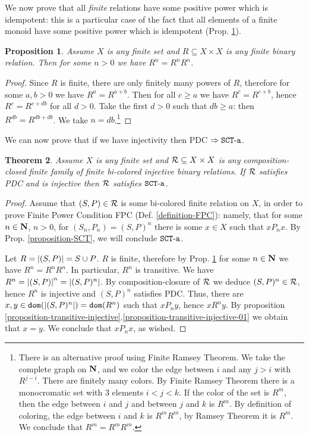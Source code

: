 \documentclass{lmcs}
\newtheorem{theorem}{Theorem}[section]
\newtheorem{proposition}[theorem]{Proposition}
\begin{document}
We now prove that all \emph{finite} relations have some positive power which is idempotent:
this is a particular case of the fact that all elements of a finite monoid 
have some positive power which is idempotent (Prop. \ref{proposition-idempotent-power}).

\begin{proposition}
\label{proposition-idempotent-power}
Assume $X$ is any finite set and $R \subseteq X \times X$ is any finite binary relation.
Then for some $n>0$ we have $R^n=R^nR^n$.
\end{proposition}

\begin{proof}
Since $R$ is finite, there are only finitely many powers of $R$, therefore 
for some $a,b>0$ we have $R^a = R^{a+b}$. Then for all $c \ge a$ we have $R^c = R^{c+b}$,
hence $R^c = R^{c+db}$ for all $d>0$. Take the first $d>0$ such that $db \ge a$: then 
$R^{db} = R^{db+db}$. We take $n=db$.\footnote{There is an alternative proof using
Finite Ramsey Theorem. We take the complete graph on ${\bf N}$, and we color the 
edge between $i$ and any $j>i$ with $R^{j-i}$. There are finitely many colors.
By Finite Ramsey Theorem there is a monocromatic set with $3$ elements $i<j<k$. 
If the color of the set is $R^m$, then the edge between $i$ and $j$ and between $j$ and $k$
is $R^m$. By definition of coloring, the edge between $i$ and $k$ is $R^mR^m$, 
by Ramsey Theorem it is $R^m$. We conclude that $R^m = R^mR^m$. }
\end{proof}

We can now prove that if we have injectivity then PDC $\Rightarrow {\tt SCT\mbox{-}a}$.

\begin{theorem}
Assume $X$ is any finite set and ${\mathcal R} \subseteq X \times X$ is any composition-closed
finite family of finite bi-colored \emph{injective} binary relations. If ${\mathcal R}$ satisfies PDC and 
is \emph{injective} then ${\mathcal R}$ satisfies ${\tt SCT\mbox{-}a}$.
\end{theorem}


\begin{proof}
Assume that $(S,P) \in {\mathcal R}$ is some bi-colored finite relation on $X$,
in order to prove Finite Power Condition FPC (Def. \ref{definition-FPC}): namely, 
that for some $n \in {\bf N}$, $n>0$, for $(S_n,P_n) = (S,P)^n$ there is some
$x \in X$ such that $x P_n x$. By Prop. \ref{proposition-SCT}, we will conclude ${\tt SCT\mbox{-}a}$.

Let $R = {| (S,P) |} = S \cup P$. $R$ is finite, therefore by Prop. 
\ref{proposition-idempotent-power} for some $n \in {\bf N}$ we have $R^n = R^nR^n$. 
In particular, $R^n$ is transitive. 
We have $R^n = {| (S,P) |}^n = {| (S,P)^n |}$. By composition-closure of 
${\mathcal R}$ we deduce  $(S,P)^n \in {\mathcal R}$, hence $R^n$ is injective and $(S,P)^n$ satisfies PDC. 
Thus, there are $x, y \in {\tt dom}({| (S,P)^n |}) = {\tt dom}(R^n)$ such that $x P_n y$, 
hence $x R^n y$. By proposition 
\ref{proposition-transitive-injective}.\ref{proposition-transitive-injective-01} 
we obtain that $x = y$. We conclude that $x P_n x$, as wished.
\end{proof}
\end{document}
